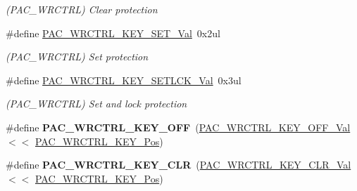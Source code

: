 \begin{DoxyCompactItemize}
\begin{DoxyCompactList}\small\item\em (P\+A\+C\+\_\+\+W\+R\+C\+T\+R\+L) Clear protection \end{DoxyCompactList}\item 
\hypertarget{group___s_a_m_l21___p_a_c_ga4546bc0b91f6f0a0283eb1a9e48c767d}{}\#define \hyperlink{group___s_a_m_l21___p_a_c_ga4546bc0b91f6f0a0283eb1a9e48c767d}{P\+A\+C\+\_\+\+W\+R\+C\+T\+R\+L\+\_\+\+K\+E\+Y\+\_\+\+S\+E\+T\+\_\+\+Val}~0x2ul\label{group___s_a_m_l21___p_a_c_ga4546bc0b91f6f0a0283eb1a9e48c767d}

\begin{DoxyCompactList}\small\item\em (P\+A\+C\+\_\+\+W\+R\+C\+T\+R\+L) Set protection \end{DoxyCompactList}\item 
\hypertarget{group___s_a_m_l21___p_a_c_ga743a61ffc754e8f10947372a73e07289}{}\#define \hyperlink{group___s_a_m_l21___p_a_c_ga743a61ffc754e8f10947372a73e07289}{P\+A\+C\+\_\+\+W\+R\+C\+T\+R\+L\+\_\+\+K\+E\+Y\+\_\+\+S\+E\+T\+L\+C\+K\+\_\+\+Val}~0x3ul\label{group___s_a_m_l21___p_a_c_ga743a61ffc754e8f10947372a73e07289}

\begin{DoxyCompactList}\small\item\em (P\+A\+C\+\_\+\+W\+R\+C\+T\+R\+L) Set and lock protection \end{DoxyCompactList}\item 
\hypertarget{group___s_a_m_l21___p_a_c_ga5fe0f9b9016aa71a3401a5f85e6a2419}{}\#define {\bfseries P\+A\+C\+\_\+\+W\+R\+C\+T\+R\+L\+\_\+\+K\+E\+Y\+\_\+\+O\+F\+F}~(\hyperlink{group___s_a_m_l21___p_a_c_gaab794b38156768a64abe6a8a232f4322}{P\+A\+C\+\_\+\+W\+R\+C\+T\+R\+L\+\_\+\+K\+E\+Y\+\_\+\+O\+F\+F\+\_\+\+Val}        $<$$<$ \hyperlink{group___s_a_m_l21___p_a_c_ga40efb8e0f647731be9f0df54d385282d}{P\+A\+C\+\_\+\+W\+R\+C\+T\+R\+L\+\_\+\+K\+E\+Y\+\_\+\+Pos})\label{group___s_a_m_l21___p_a_c_ga5fe0f9b9016aa71a3401a5f85e6a2419}

\item 
\hypertarget{group___s_a_m_l21___p_a_c_ga73abea9fa0afec9b59ab00c4eb171143}{}\#define {\bfseries P\+A\+C\+\_\+\+W\+R\+C\+T\+R\+L\+\_\+\+K\+E\+Y\+\_\+\+C\+L\+R}~(\hyperlink{group___s_a_m_l21___p_a_c_ga5ee6860a242b2e370966db4a8e897d65}{P\+A\+C\+\_\+\+W\+R\+C\+T\+R\+L\+\_\+\+K\+E\+Y\+\_\+\+C\+L\+R\+\_\+\+Val}        $<$$<$ \hyperlink{group___s_a_m_l21___p_a_c_ga40efb8e0f647731be9f0df54d385282d}{P\+A\+C\+\_\+\+W\+R\+C\+T\+R\+L\+\_\+\+K\+E\+Y\+\_\+\+Pos})\label{group___s_a_m_l21___p_a_c_ga73abea9fa0afec9b59ab00c4eb171143}


\end{DoxyCompactItemize}
